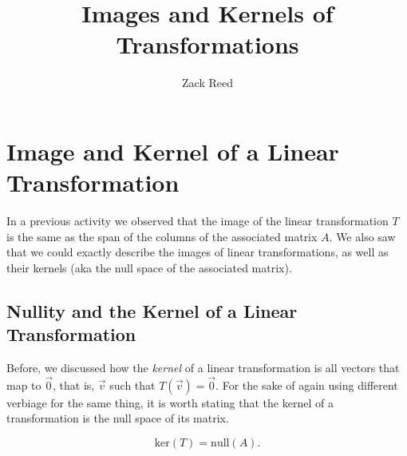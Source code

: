 \documentclass{ximera}
\author{Zack Reed}
\title{Images and Kernels of Transformations}
\begin{document}
\begin{abstract}

\end{abstract}
\maketitle

\section*{Image and Kernel of a Linear Transformation}

In a previous activity we observed that the image of the linear transformation $T$ is the same as the span of the columns of the associated matrix $A$. We also saw that we could exactly describe the images of linear transformations, as well as their kernels (aka the null space of the associated matrix).
 
\subsection*{Nullity and the Kernel of a Linear Transformation}
 
Before, we discussed how the \emph{kernel} of a linear transformation is all vectors that map to $\vec{0}$, that is, $\vec{v}$ such that $T(\vec{v})=\vec{0}$. For the sake of again using different verbiage for the same thing, it is worth stating that the kernel of a transformation is the null space of its matrix.



$$\mbox{ker}(T)=\mbox{null}(A).$$
 
\end{document}
